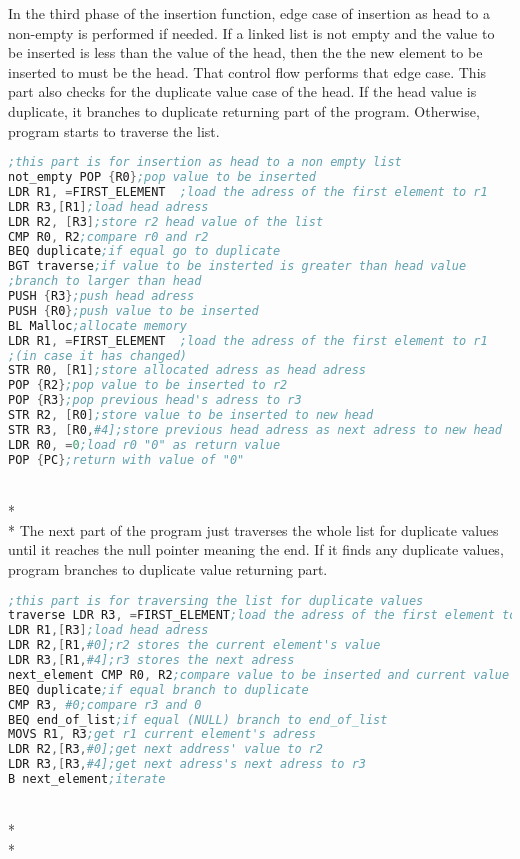 \documentclass[pdftex,12pt,a4paper]{article}
\begin{document}
\quad In the third phase of the insertion function, edge case of insertion as head to a non-empty is performed if needed. If a linked list is not empty and the value to be inserted is less than the value of the head, then the the new element to be inserted to must be the head. That control flow performs that edge case. This part also checks for the duplicate value case of the head. If the head value is duplicate, it branches to duplicate returning part of the program. Otherwise, program starts to traverse the list.
\begin{lstlisting}[language=Assembler]
;this part is for insertion as head to a non empty list
not_empty POP {R0};pop value to be inserted
LDR R1, =FIRST_ELEMENT	;load the adress of the first element to r1
LDR R3,[R1];load head adress
LDR R2, [R3];store r2 head value of the list
CMP R0, R2;compare r0 and r2
BEQ duplicate;if equal go to duplicate
BGT traverse;if value to be insterted is greater than head value 
;branch to larger than head
PUSH {R3};push head adress
PUSH {R0};push value to be inserted
BL Malloc;allocate memory
LDR R1, =FIRST_ELEMENT	;load the adress of the first element to r1 
;(in case it has changed)
STR R0, [R1];store allocated adress as head adress
POP {R2};pop value to be inserted to r2
POP {R3};pop previous head's adress to r3
STR R2, [R0];store value to be inserted to new head
STR R3, [R0,#4];store previous head adress as next adress to new head
LDR R0, =0;load r0 "0" as return value
POP {PC};return with value of "0"
\end{lstlisting}\\*\\*
\quad The next part of the program just traverses the whole list for duplicate values until it reaches the null pointer meaning the end. If it finds any duplicate values, program branches to duplicate value returning part.
\begin{lstlisting}[language=Assembler]
;this part is for traversing the list for duplicate values
traverse LDR R3, =FIRST_ELEMENT;load the adress of the first element to r3	
LDR R1,[R3];load head adress
LDR R2,[R1,#0];r2 stores the current element's value
LDR R3,[R1,#4];r3 stores the next adress
next_element CMP R0, R2;compare value to be inserted and current value
BEQ duplicate;if equal branch to duplicate
CMP R3, #0;compare r3 and 0
BEQ end_of_list;if equal (NULL) branch to end_of_list
MOVS R1, R3;get r1 current element's adress
LDR R2,[R3,#0];get next address' value to r2
LDR R3,[R3,#4];get next adress's next adress to r3
B next_element;iterate
\end{lstlisting}\\*\\*
\end{document}
